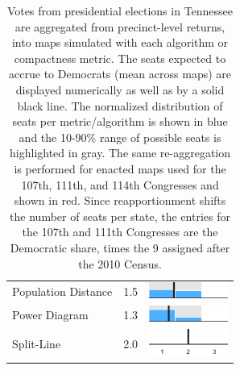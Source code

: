 \begin{table}
\begin{tabular}{l rm{7em}}
Population Distance    &   1.5 &       \includegraphics[width=7em]{mini_hist/TN_2016_dist_p} \\
Power Diagram          &   1.3 &        \includegraphics[width=7em]{mini_hist/TN_2016_power} \\
Split-Line             &   2.0 &        \includegraphics[width=7em]{mini_hist/TN_2016_split_ax} \\
\hline \hline
\end{tabular}
\caption{Votes from presidential elections in Tennessee are aggregated from precinct-level returns, into maps simulated with each algorithm or compactness metric. 
             The seats expected to accrue to Democrats (mean across maps) are displayed numerically as well as by a solid black line.
             The normalized distribution of seats per metric/algorithm is shown in blue and the 10-90\% range of possible seats is highlighted in gray.
             The same re-aggregation is performed for enacted maps used for the 107th, 111th, and 114th Congresses and shown in red.
             Since reapportionment shifts the number of seats per state,
               the entries for the 107th and 111th Congresses are the Democratic share,
               times the 9 assigned after the 2010 Census.
             }\label{tab:TN_seats}
\end{table}
 